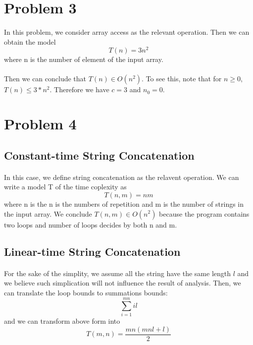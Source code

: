 \documentclass{article}
\begin{document}
\section{Problem 3}

\paragraph{}
In this problem, we consider array access as the relevant operation. Then we can obtain the model 
\[ T(n) = 3n^2 \]
where n is the number of element of the input array.

\paragraph{}
Then we can conclude that $ T(n) \in O(n^2) $. To see this, note that for $ n \geq 0 $, $ T(n) \leq 3 * n^2 $. 
Therefore we have $ c = 3 $ and $ n_0 = 0 $.


\section{Problem 4}

\subsection{Constant-time String Concatenation}
\paragraph{}
In this case, we define string concatenation as the relavent operation. We can write a model T of the time coplexity as 
\[ T(n, m) =  nm \]
where n is the n is the numbers of repetition and m is the number of strings in the input array.
We conclude $ T(n, m) \in O(n^2) $ because the program contains two loops and number of loops decides by both n and m.

\subsection{Linear-time String Concatenation}
\paragraph{}
For the sake of the simplity, we assume all the string have the same length $ l $ and we believe such simplication will not influence
the result of analysis. Then, we can translate the loop bounds to summations bounds: 
\[ \sum_{i=1}^{mn} il \]
and we can transform above form into
\[ T(m, n) = \frac{mn(mnl + l)}{2}\]
\end{document}

